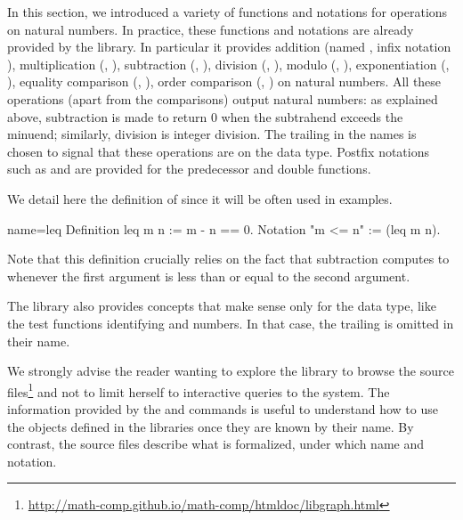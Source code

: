 

In this section, we introduced a variety of functions and notations
for operations on natural numbers.  In practice, these functions and
notations are already provided by the \mcbMC{} library.  In particular
it provides addition (named , infix notation \C{+}),
multiplication
(, \C{*}), subtraction (, \C{-}), division (,
\C{\%/}),  modulo (, \C{\%\%}), exponentiation (, \C{\^}),
equality comparison (, \C{==}), order
comparison (, \C{<=}) on natural numbers.  All these operations
(apart from the comparisons)
output natural numbers: as explained above, subtraction is made to
return \(0\) when the subtrahend exceeds the minuend; similarly,
division is integer division.  The trailing  in
the names is chosen to signal that these operations are on the  data
type.  Postfix notations such as  and  are provided for
the predecessor and double functions.

We detail here the definition of  since it will be often used
in examples.

\begin{coq}{name=leq}{}
Definition leq m n := m - n == 0.
Notation "m <= n" := (leq m n).
\end{coq}

Note that this definition crucially relies on the fact that
subtraction computes to  whenever the first argument is less than
or equal to the second argument.

The \mcbMC{} library also provides concepts that make sense only
for the  data type, like the
test functions identifying  and  numbers. In that
case, the trailing  is omitted in their name.

We strongly advise the reader wanting to explore the \mcbMC{} library
to browse the source
files\footnote{\url{http://math-comp.github.io/math-comp/htmldoc/libgraph.html}}
and not to limit herself to interactive queries to the system. The
information provided by the  and  commands is
useful to understand how to use the objects defined in the libraries
once they are known by their name. By contrast, the source
files describe what is formalized, under which name and notation.

